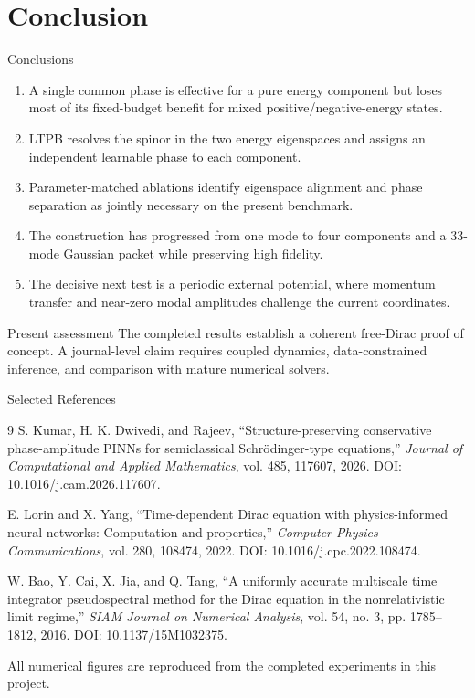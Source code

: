 \documentclass[aspectratio=169,10pt]{beamer}
\begin{document}
\section{Conclusion}

\begin{frame}{Conclusions}
\begin{enumerate}
  \item A single common phase is effective for a pure energy component but loses
  most of its fixed-budget benefit for mixed positive/negative-energy states.
  \item LTPB resolves the spinor in the two energy eigenspaces and assigns an
  independent learnable phase to each component.
  \item Parameter-matched ablations identify eigenspace alignment and phase
  separation as jointly necessary on the present benchmark.
  \item The construction has progressed from one mode to four components and a
  33-mode Gaussian packet while preserving high fidelity.
  \item The decisive next test is a periodic external potential, where momentum
  transfer and near-zero modal amplitudes challenge the current coordinates.
\end{enumerate}

\begin{block}{Present assessment}
The completed results establish a coherent free-Dirac proof of concept. A
journal-level claim requires coupled dynamics, data-constrained inference, and
comparison with mature numerical solvers.
\end{block}
\end{frame}

\begin{frame}{Selected References}
\footnotesize
\begin{thebibliography}{9}
S. Kumar, H. K. Dwivedi, and Rajeev,
``Structure-preserving conservative phase-amplitude PINNs for semiclassical
Schr\"odinger-type equations,''
\emph{Journal of Computational and Applied Mathematics}, vol. 485, 117607,
2026. DOI: 10.1016/j.cam.2026.117607.

E. Lorin and X. Yang,
``Time-dependent Dirac equation with physics-informed neural networks:
Computation and properties,''
\emph{Computer Physics Communications}, vol. 280, 108474, 2022.
DOI: 10.1016/j.cpc.2022.108474.

W. Bao, Y. Cai, X. Jia, and Q. Tang,
``A uniformly accurate multiscale time integrator pseudospectral method for the
Dirac equation in the nonrelativistic limit regime,''
\emph{SIAM Journal on Numerical Analysis}, vol. 54, no. 3, pp. 1785--1812,
2016. DOI: 10.1137/15M1032375.
\end{thebibliography}

\vfill
\centering
All numerical figures are reproduced from the completed experiments in this
project.
\end{frame}
\end{document}

